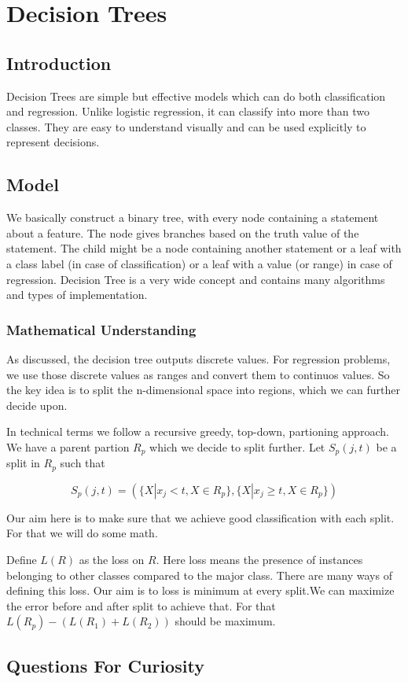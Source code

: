 
\chapter{Decision Trees}
\label{chp:decision}

\section{Introduction}
Decision Trees are simple but effective models which can do both classification
and regression. Unlike logistic regression, it can classify into more than two classes.
They are easy to understand visually and can be used explicitly to represent decisions.

\section{Model}
We basically construct a binary tree, with every node containing a statement about a feature.
The node gives branches based on the truth value of the statement. The child might be a node containing
another statement or a leaf with a class label (in case of classification) or a leaf with a value (or range) in case of
regression. Decision Tree is a very wide concept and contains many algorithms and types of implementation.

\subsection{Mathematical Understanding}
As discussed, the decision tree outputs discrete values. For regression problems, we
use those discrete values as ranges and convert them to continuos values. So the key idea is to
split the n-dimensional space into regions, which we can further decide upon.

In technical terms we follow a recursive greedy, top-down, partioning approach.
We have a parent partion $R_p$ which we decide to split further.
Let $S_p(j,t)$ be a split in $R_p$ such that

\begin{equation}
    S_p(j,t) =  ( \{ X | x_j<t,X \in R_p \} , \{ X | x_j\geq t,X \in R_p \} )
\end{equation}

Our aim here is to make sure that we achieve good classification with each split.
For that we will do some math.

Define $L(R)$ as the loss on $R$. Here loss means the presence of instances belonging
to other classes compared to the major class. There are many ways of defining this loss.
Our aim is to loss is minimum at every split.We can maximize the error before and 
after split to achieve that. For that
$L(R_p)-(L(R_1)+L(R_2))$
 should be maximum.


\section{Questions For Curiosity}